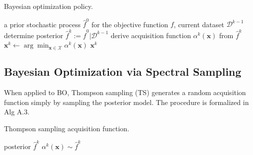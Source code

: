 \documentclass{article}
\begin{document}
\begin{algorithm}[h]
  \caption{Bayesian optimization policy.}
  \label{alg:BOpolicy}
  \begin{algorithmic}[1] %
    \Input a prior stochastic process $\widehat{f}^0$ for the objective function $f$, current dataset $\mathcal{D}^{k-1}$
    \State determine posterior
    $\widehat{f}^k := \widehat{f}^0 | \mathcal{D}^{k-1}$
    \State derive acquisition function $\alpha^k(\mathbf{x})$ from
    $\widehat{f}^k$
    \State $\mathbf{x}^k \gets \arg\min_{\mathbf{x} \in \mathcal{X}} \alpha^k(\mathbf{x})$
    \State \Return $\mathbf{x}^k$
  \end{algorithmic}
\end{algorithm}

\subsection{Bayesian Optimization via Spectral Sampling}

When applied to BO, Thompson sampling (TS) generates a random
acquisition function simply by sampling the posterior model. The
procedure is formalized in Alg A.3.

\begin{algorithm}[h]
  \caption{Thompson sampling acquisition function.}
  \label{alg:TS}
  \begin{algorithmic}[1] %
    \Input posterior $\widehat{f}^k$
    \State \Return $\alpha^k(\mathbf{x}) \sim \widehat{f}^k$
  \end{algorithmic}
\end{algorithm}
\end{document}
